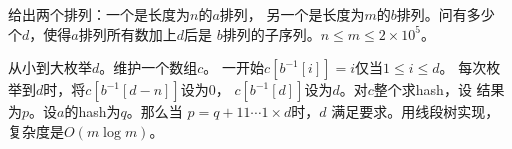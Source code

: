 \begin{prob}
	给出两个排列：一个是长度为$n$的$a$排列，
	另一个是长度为$m$的$b$排列。问有多少
	个$d$，使得$a$排列所有数加上$d$后是
	$b$排列的子序列。$n \le m \le 2 \times 10^5$。
\end{prob}

\begin{sol}
	从小到大枚举$d$。维护一个数组$c$。
	一开始$c[b^{-1}[i]]=i$仅当$1 \le i \le d$。
	每次枚举到$d$时，将$c[b^{-1}[d-n]]$设为0，
	$c[b^{-1}[d]]$设为$d$。对$c$整个求hash，设
	结果为$p$。设$a$的hash为$q$。那么当
	$p = q + 11\cdots 1 \times d$时，$d$
	满足要求。用线段树实现，复杂度是$O(m\log m)$。
\end{sol}
